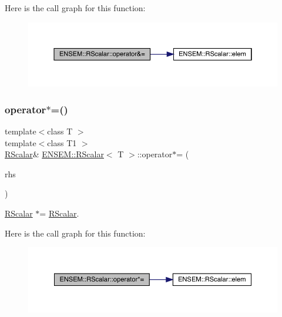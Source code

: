 Here is the call graph for this function\+:
\nopagebreak
\begin{figure}[H]
\begin{center}
\leavevmode
\includegraphics[width=350pt]{d0/d8c/classENSEM_1_1RScalar_aa091ededdea0fc13deb359321f213780_cgraph}
\end{center}
\end{figure}
\mbox{\label{classENSEM_1_1RScalar_a4e8f4b8988a47a5e5eef56424d0e23d9}} 
\subsubsection{\texorpdfstring{operator$\ast$=()}{operator*=()}\hspace{0.1cm}{\footnotesize\ttfamily [1/2]}}
{\footnotesize\ttfamily template$<$class T $>$ \\
template$<$class T1 $>$ \\
\mbox{\hyperlink{classENSEM_1_1RScalar}{R\+Scalar}}\& \mbox{\hyperlink{classENSEM_1_1RScalar}{E\+N\+S\+E\+M\+::\+R\+Scalar}}$<$ T $>$\+::operator$\ast$= (\begin{DoxyParamCaption}\item[{const \mbox{\hyperlink{classENSEM_1_1RScalar}{R\+Scalar}}$<$ T1 $>$ \&}]{rhs }\end{DoxyParamCaption})\hspace{0.3cm}{\ttfamily [inline]}}



\mbox{\hyperlink{classENSEM_1_1RScalar}{R\+Scalar}} $\ast$= \mbox{\hyperlink{classENSEM_1_1RScalar}{R\+Scalar}}. 

Here is the call graph for this function\+:
\nopagebreak
\begin{figure}[H]
\begin{center}
\leavevmode
\includegraphics[width=350pt]{d0/d8c/classENSEM_1_1RScalar_a4e8f4b8988a47a5e5eef56424d0e23d9_cgraph}
\end{center}
\end{figure}
\mbox{\label{classENSEM_1_1RScalar_a4e8f4b8988a47a5e5eef56424d0e23d9}} 
